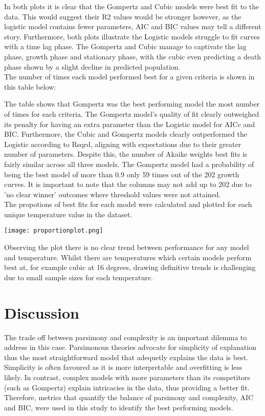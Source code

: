 \documentclass[11pt]{article}
\begin{document}
In both plots it is clear that the Gompertz and Cubic models were best fit to the data. This would suggest their R2 values would be stronger however, as the logistic model contains fewer parameters, AIC and BIC values may tell a different story. Furthermore, both plots illustrate the Logistic models struggle to fit curves with a time lag phase. The Gompertz and Cubic manage to captivate the lag phase, growth phase and stationary phase, with the cubic even predicting a death phase shown by a slight decline in predicted population.\\

The number of times each model performed best for a given criteria is shown in this table below: 
\begin{center}
\end{center}
The table shows that Gompertz was the best performing model the most number of times for each criteria. The Gompertz model's quality of fit clearly outweighed its penalty for having an extra parameter than the Logistic model for AICc and BIC. Furthermore, the Cubic and Gompertz models clearly outperformed the Logistic according to Rsqrd, aligning with expectations due to their greater number of parameters. Despite this, the number of Akaike weights best fits is fairly similar across all three models. The Gompertz model had a probability of being the best model of more than 0.9 only 59 times out of the 202 growth curves. It is important to note that the columns may not add up to 202 due to 'no clear winner' outcomes where threshold values were not attained.\\

The propotions of best fits for each model were calculated and plotted for each unique temperature value in the dataset. 
  \begin{center}
    \texttt{[image: proportionplot.png]} 
  \end{center}
Observing the plot there is no clear trend between performance for any model and temperature. Whilst there are temperatures which certain models perform best at, for example cubic at 16 degrees, drawing definitive trends is challenging due to small sample sizes for each temperature.

\section{Discussion}

The trade off between parsimony and complexity is an important dilemma to address in this case. Parsimonous theories advocate for simplicity of explanation \cite{Coelho2019} thus the most straightforward model that adequetly explains the data is best. Simplicity is often favoured as it is more interpretable and overfitting is less likely. In contrast, complex models with more parameters than its competitors (such as Gompertz) explain intricacies in the data, thus providing a better fit. Therefore, metrics that quantify the balance of parsimony and complexity, AIC and BIC, were used in this study to identify the best performing models.\\
\end{document}

